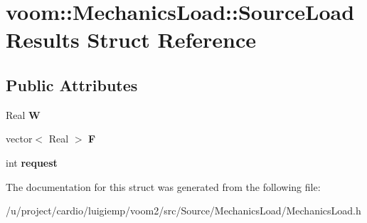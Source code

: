 \hypertarget{structvoom_1_1_mechanics_load_1_1_source_load_results}{
\section{voom::MechanicsLoad::SourceLoadResults Struct Reference}
\label{structvoom_1_1_mechanics_load_1_1_source_load_results}
}
\subsection*{Public Attributes}
\begin{DoxyCompactItemize}
\item 
\hypertarget{structvoom_1_1_mechanics_load_1_1_source_load_results_ac43e13a504f568f44905a739e0873af7}{
Real {\bfseries W}}
\label{structvoom_1_1_mechanics_load_1_1_source_load_results_ac43e13a504f568f44905a739e0873af7}

\item 
\hypertarget{structvoom_1_1_mechanics_load_1_1_source_load_results_ae4ebcc2c4643cde11db4575356d02ee5}{
vector$<$ Real $>$ {\bfseries F}}
\label{structvoom_1_1_mechanics_load_1_1_source_load_results_ae4ebcc2c4643cde11db4575356d02ee5}

\item 
\hypertarget{structvoom_1_1_mechanics_load_1_1_source_load_results_a59415873eaca4e29c3cbfb99501de065}{
int {\bfseries request}}
\label{structvoom_1_1_mechanics_load_1_1_source_load_results_a59415873eaca4e29c3cbfb99501de065}

\end{DoxyCompactItemize}


The documentation for this struct was generated from the following file:\begin{DoxyCompactItemize}
\item 
/u/project/cardio/luigiemp/voom2/src/Source/MechanicsLoad/MechanicsLoad.h\end{DoxyCompactItemize}

